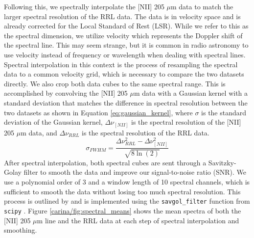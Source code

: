 Following this, we spectrally interpolate the [NII] 205 $\mu$m data to match the larger spectral resolution of the RRL data.
The data is in velocity space and is already corrected for the Local Standard of Rest (LSR).
While we refer to this as the spectral dimension, we utilize velocity which represents the Doppler shift of the spectral line.
This may seem strange, but it is common in radio astronomy to use velocity instead of frequency or wavelength when dealing with spectral lines.
Spectral interpolation in this context is the process of resampling the spectral data to a common velocity grid, which is necessary to compare the two datasets directly.
We also crop both data cubes to the same spectral range. 
This is accomplished by convolving the [NII] 205 $\mu$m data with a Gaussian kernel with a standard deviation that matches the difference in spectral resolution between the two datasets as shown in Equation \ref{eq:gaussian_kernel}, where $\sigma$ is the standard deviation of the Gaussian kernel, $\Delta \nu_{[NII]}$ is the spectral resolution of the [NII] 205 $\mu$m data, and $\Delta \nu_{RRL}$ is the spectral resolution of the RRL data.
\begin{equation}
    \sigma_{FWHM} = \frac{\Delta \nu_{RRL}^2 - \Delta \nu_{[NII]}^2}{\sqrt{8\ln(2)}}
    \label{eq:gaussian_kernel}
\end{equation}
After spectral interpolation, both spectral cubes are sent through a Savitzky-Golay filter to smooth the data and improve our signal-to-noise ratio (SNR). 
We use a polynomial order of 3 and a window length of 10 spectral channels, which is sufficient to smooth the data without losing too much spectral resolution. 
This process is outlined by \cite{pineda2019electron} and is implemented using the \texttt{savgol\_filter} function from \texttt{scipy} \parencite{2020SciPy-NMeth}.
Figure \ref{carina/fig:spectral_means} shows the mean spectra of both the [NII] 205 $\mu$m line and the RRL data at each step of spectral interpolation and smoothing.

